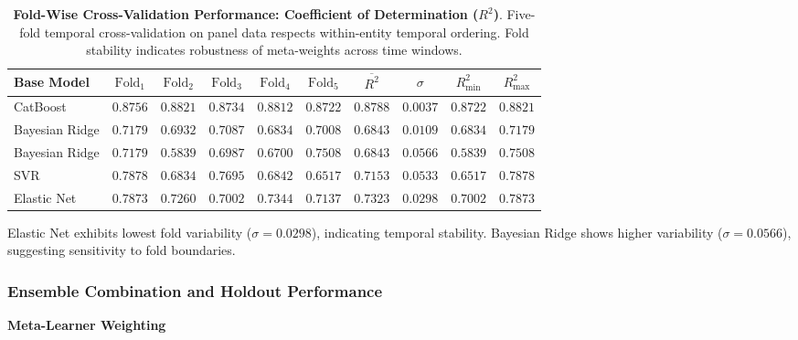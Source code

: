 \documentclass[12pt,a4paper]{article}
\begin{document}
\begin{table}[H]
\centering
\caption{%
    \textbf{Fold-Wise Cross-Validation Performance: Coefficient of Determination ($R^2$)}.
    Five-fold temporal cross-validation on panel data respects within-entity temporal ordering.
    Fold stability indicates robustness of meta-weights across time windows.
}
\label{tab:cv_stability}
\small
\begin{tabular}{lccccccccc}
\toprule
\textbf{Base Model} & $\text{Fold}_1$ & $\text{Fold}_2$ & $\text{Fold}_3$ & $\text{Fold}_4$ & $\text{Fold}_5$ 
                  & $\overline{R^2}$ & $\sigma$ & $R^2_{\min}$ & $R^2_{\max}$ \\
\midrule
CatBoost           & $0.8756$ & $0.8821$ & $0.8734$ & $0.8812$ & $0.8722$ & $0.8788$ & $0.0037$ & $0.8722$ & $0.8821$ \\
Bayesian Ridge     & $0.7179$ & $0.6932$ & $0.7087$ & $0.6834$ & $0.7008$ & $0.6843$ & $0.0109$ & $0.6834$ & $0.7179$ \\
Bayesian Ridge     & $0.7179$ & $0.5839$ & $0.6987$ & $0.6700$ & $0.7508$ & $0.6843$ & $0.0566$ & $0.5839$ & $0.7508$ \\
SVR & $0.7878$ & $0.6834$ & $0.7695$ & $0.6842$ & $0.6517$ & $0.7153$ & $0.0533$ & $0.6517$ & $0.7878$ \\
Elastic Net        & $0.7873$ & $0.7260$ & $0.7002$ & $0.7344$ & $0.7137$ & $0.7323$ & $0.0298$ & $0.7002$ & $0.7873$ \\
\bottomrule
\end{tabular}
\begin{flushleft}
\footnotesize
Elastic Net exhibits lowest fold variability ($\sigma = 0.0298$), indicating temporal stability.
Bayesian Ridge shows higher variability ($\sigma = 0.0566$), suggesting sensitivity to fold boundaries.
\end{flushleft}
\end{table}

\FloatBarrier

\subsubsection{Ensemble Combination and Holdout Performance}

\textbf{Meta-Learner Weighting}
\end{document}
